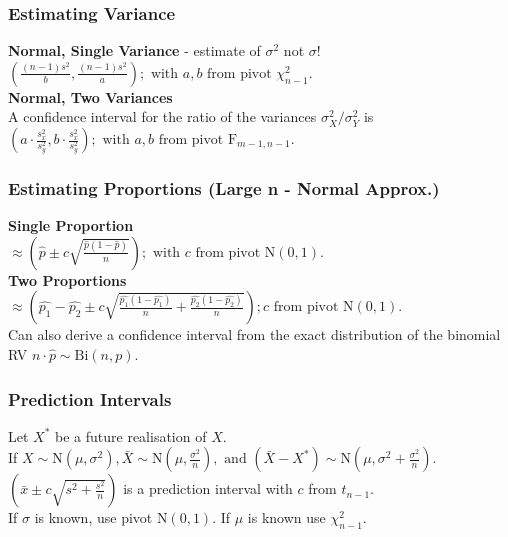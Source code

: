 \documentclass{article}
\begin{document}
\begin{multicols*}{2}
{\color{magenta}\subsubsection*{Estimating Variance}}
\textbf{Normal, Single Variance} - {\color{red} estimate of $\sigma^{2}$ not $\sigma$!}\\
$ \left( \frac{(n-1) s^{2}}{b}, \frac{(n-1) s^{2}}{a} \right); \mbox{ with } a, b \mbox{ from pivot } \chi^{2}_{n-1}.$\\
\textbf{Normal, Two Variances}\\
A confidence interval for the ratio of the variances $\sigma_{X}^{2} / \sigma_{Y}^{2}$ is
$ \left( a \cdot \frac{s_{x}^{2}}{s_{y}^{2}}, b \cdot \frac{s_{x}^{2}}{s_{y}^{2}} \right); \mbox{ with } a, b \mbox{ from pivot } \mbox{F}_{m-1,n-1}.$

{\color{magenta}\subsubsection*{Estimating Proportions (Large n - Normal Approx.)}}
\textbf{Single Proportion}\\
$ \approx \left( \hat{p} \pm c \sqrt{\frac{\hat{p} (1-\hat{p})}{n}} \right); \mbox{ with } c \mbox{ from pivot } \mbox{N}(0, 1).$\\
\textbf{Two Proportions}\\
$ \approx \left( \hat{p_{1}} - \hat{p_{2}} \pm c \sqrt{\frac{\hat{p_{1}} (1-\hat{p_{1}})}{n} + \frac{\hat{p_{2}} (1-\hat{p_{2}})}{n}} \right); c \mbox{ from pivot } \mbox{N}(0, 1).$\\
Can also derive a confidence interval from the exact distribution of the binomial RV $n \cdot \hat{p} \sim \mbox{Bi}(n, p)$.

{\color{magenta}\subsubsection*{Prediction Intervals}}
Let $X^{*}$ be a future realisation of $X$.\\
If $X \sim \mbox{N}(\mu, \sigma^{2}), \bar{X} \sim \mbox{N}(\mu, \frac{\sigma^{2}}{n}), \mbox{ and } (\bar{X}-X^{*}) \sim \mbox{N}(\mu, \sigma^{2} + \frac{\sigma^{2}}{n})$.\\
$\left( \bar{x} \pm c \sqrt{s^{2} + \frac{s^{2}}{n}} \right)$ is a prediction interval with $c$ from $t_{n-1}$.\\
If $\sigma$ is known, use pivot $\mbox{N}(0, 1)$. If $\mu$ is known use $\chi^{2}_{n-1}$.


\end{multicols*}
\end{document}
